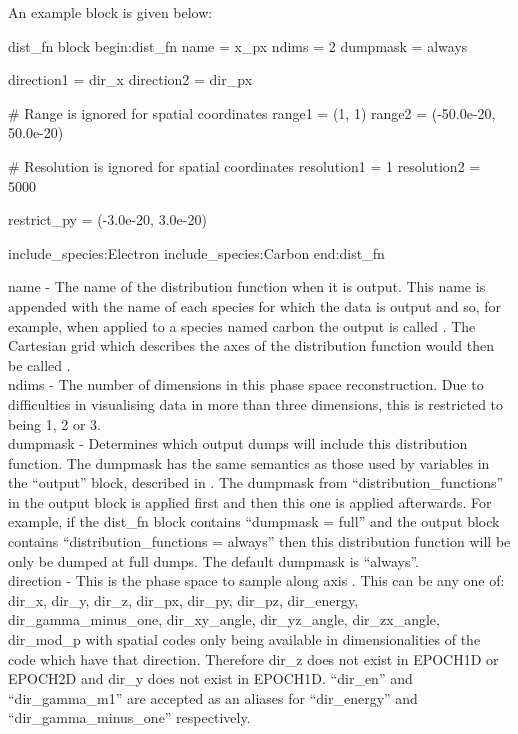 An example  block is given below:
{\samepage
\begin{lboxverbatim}{dist\_fn block}
begin:dist_fn
   name = x_px
   ndims = 2
   dumpmask = always

   direction1 = dir_x
   direction2 = dir_px

   # Range is ignored for spatial coordinates
   range1 = (1, 1)
   range2 = (-50.0e-20, 50.0e-20)

   # Resolution is ignored for spatial coordinates
   resolution1 = 1
   resolution2 = 5000

   restrict_py = (-3.0e-20, 3.0e-20)

   include_species:Electron
   include_species:Carbon
end:dist_fn
\end{lboxverbatim}
}

{\emphtext name} - The name of the distribution function when it is
output. This name is appended with the name of each species for which the data
is output and so, for example, when applied to a species named
carbon the output is called . The Cartesian grid
which describes the axes of the distribution function would then be called
.\\

{\emphtext ndims} - The number of dimensions in this phase space
reconstruction. Due to difficulties in visualising data in more than three
dimensions, this is restricted to being 1, 2 or 3.\\

{\emphtext dumpmask} - Determines which output dumps will include this
distribution function. The dumpmask has the same semantics as those used
by variables in the ``output'' block, described in .
The dumpmask from ``distribution\_functions'' in the output block is applied
first and then this one is applied afterwards. For example, if the
dist\_fn block contains ``dumpmask = full'' and the output block contains
``distribution\_functions = always'' then this distribution function will be
only be dumped at full dumps. The default dumpmask is ``always''.\\

{\emphtext direction} - This is the phase space to sample
along axis . This can be any one of:
dir\_x, dir\_y, dir\_z, dir\_px, dir\_py, dir\_pz, dir\_energy,
dir\_gamma\_minus\_one, dir\_xy\_angle, dir\_yz\_angle, dir\_zx\_angle,
dir\_mod\_p
with spatial codes only being available in dimensionalities of the code which
have that direction. Therefore dir\_z does not exist in EPOCH1D or EPOCH2D
and dir\_y does not exist in EPOCH1D. ``dir\_en'' and ``dir\_gamma\_m1''
are accepted as an aliases for ``dir\_energy'' and ``dir\_gamma\_minus\_one''
respectively.


